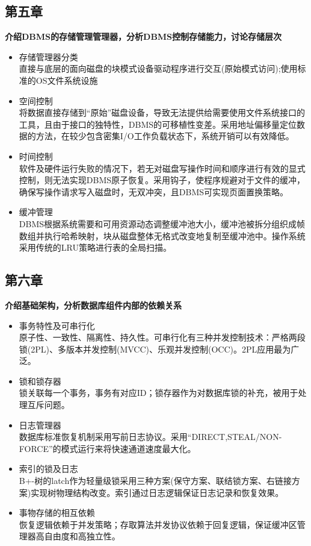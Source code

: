 \documentclass[UTF8,14pt]{article}
\numberwithin{figure}{section}
\begin{document}
\subsection{第五章}
\textbf{介绍DBMS的存储管理管理器，分析DBMS控制存储能力，讨论存储层次}
\begin{itemize}
      \item 存储管理器分类\\
            直接与底层的面向磁盘的块模式设备驱动程序进行交互(原始模式访问);使用标准的OS文件系统设施
      \item 空间控制\\
            将数据直接存储到“原始”磁盘设备，导致无法提供给需要使用文件系统接口的工具，且由于接口的独特性，DBMS的可移植性变差。采用地址偏移量定位数据的方法，在较少包含密集I/O工作负载状态下，系统开销可以有效降低。
      \item 时间控制\\
            软件及硬件运行失败的情况下，若无对磁盘写操作时间和顺序进行有效的显式控制，则无法实现DBMS原子恢复。采用钩子，使程序规避对于文件的缓冲，确保写操作请求写入磁盘时，无双冲突，且DBMS可实现页面置换策略。
      \item 缓冲管理\\
            DBMS根据系统需要和可用资源动态调整缓冲池大小，缓冲池被拆分组织成帧数组并执行哈希映射，块从磁盘整体无格式改变地复制至缓冲池中。操作系统采用传统的LRU策略进行表的全局扫描。
\end{itemize}
\subsection{第六章}
\textbf{介绍基础架构，分析数据库组件内部的依赖关系}
\begin{itemize}
      \item 事务特性及可串行化\\
            原子性、一致性、隔离性、持久性。可串行化有三种并发控制技术：严格两段锁(2PL)、多版本并发控制(MVCC)、乐观并发控制(OCC)。2PL应用最为广泛。
      \item 锁和锁存器\\
            锁关联每一个事务，事务有对应ID；锁存器作为对数据库锁的补充，被用于处理互斥问题。
      \item 日志管理器\\
            数据库标准恢复机制采用写前日志协议。采用“DIRECT,STEAL/NON-FORCE”的模式运行来将快速通道速度最大化。
      \item 索引的锁及日志\\
            B+-树的latch作为轻量级锁采用三种方案(保守方案、联结锁方案、右链接方案)实现树物理结构改变。索引通过日志逻辑保证日志记录和恢复效果。
      \item 事物存储的相互依赖\\
            恢复逻辑依赖于并发策略；存取算法并发协议依赖于回复逻辑，保证缓冲区管理器高自由度和高独立性。
\end{itemize}
\end{document}
